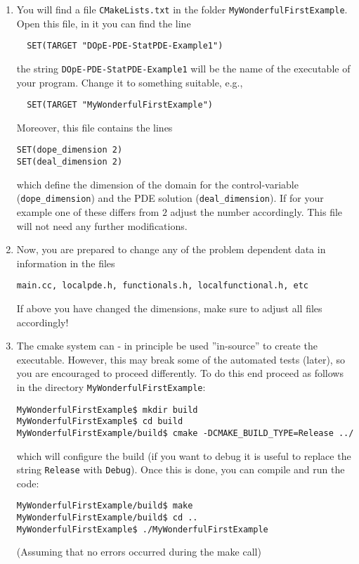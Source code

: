\begin{enumerate}
\item You will find a file \texttt{CMakeLists.txt} in the folder 
\texttt{MyWonderfulFirstExample}. Open this file, in it you can 
find the line 
\begin{verbatim}
  SET(TARGET "DOpE-PDE-StatPDE-Example1")
\end{verbatim}
the string \texttt{DOpE-PDE-StatPDE-Example1} will be the name of the
executable of your program. Change it to something suitable, e.g.,
\begin{verbatim}
  SET(TARGET "MyWonderfulFirstExample")
\end{verbatim}
Moreover, this file contains the lines 
\begin{verbatim}
SET(dope_dimension 2)
SET(deal_dimension 2)
\end{verbatim}
which define the dimension of the domain for the control-variable
(\texttt{dope\_dimension})
and the PDE solution (\texttt{deal\_dimension}). If for your example 
one of these differs from $2$ adjust the number accordingly.
This file will not need any further modifications.

\item  Now, you are prepared to change any of the problem
  dependent data in information in the files 
\begin{verbatim}
main.cc, localpde.h, functionals.h, localfunctional.h, etc
\end{verbatim} 
If above you have changed the dimensions, make sure to adjust all
files accordingly!

\item The cmake system can - in principle be used
  ''in-source'' to create the executable. 
  However, this may break some of the automated tests (later),
  so you are encouraged to proceed differently. To do this end
  proceed as follows in the directory \texttt{MyWonderfulFirstExample}:
  \begin{verbatim}
MyWonderfulFirstExample$ mkdir build
MyWonderfulFirstExample$ cd build
MyWonderfulFirstExample/build$ cmake -DCMAKE_BUILD_TYPE=Release ../
\end{verbatim}
which will configure the build (if you want to debug it is useful to
replace the string \texttt{Release} with \texttt{Debug}). 
Once this is done, you can compile and run the code:
\begin{verbatim}
MyWonderfulFirstExample/build$ make 
MyWonderfulFirstExample/build$ cd ..
MyWonderfulFirstExample$ ./MyWonderfulFirstExample
\end{verbatim}
(Assuming that no errors occurred during the make call)


\end{enumerate}
